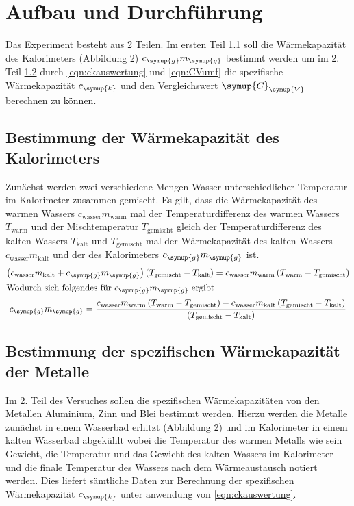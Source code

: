 \section{Aufbau und Durchführung}
\label{sec:Durchführung}
Das Experiment besteht aus 2 Teilen. Im ersten Teil \ref{sec:D1} soll die Wärmekapazität
des Kalorimeters (Abbildung 2) $c_\symup{g}m_\symup{g}$ bestimmt werden um im 2.
Teil \ref{sec:D2} durch \eqref{eqn:ckauswertung} und \eqref{eqn:CVumf} die
spezifische Wärmekapazität $c_\symup{k}$ und den Vergleichswert $\symup{C}_\symup{V}$
berechnen zu können.
\subsection{Bestimmung der Wärmekapazität des Kalorimeters}
\label{sec:D1}
Zunächst werden zwei verschiedene Mengen Wasser unterschiedlicher Temperatur
im Kalorimeter zusammen gemischt.
Es gilt, dass die Wärmekapazität des warmen Wassers
$c_\text{wasser}m_\text{warm}$ mal der Temperaturdifferenz des warmen Wassers
$T_\text{warm}$ und der Mischtemperatur $T_\text{gemischt}$ gleich der
Temperaturdifferenz des kalten Wassers $T_\text{kalt}$ und $T_\text{gemischt}$
mal der Wärmekapazität des kalten Wassers $c_\text{wasser}m_\text{kalt}$
und der des Kalorimeters $c_\symup{g}m_\symup{g}$ ist.
\begin{gather}
  \left(c_\text{wasser}m_\text{kalt}+c_\symup{g}m_\symup{g}\right)
  \left(T_\text{gemischt}-T_\text{kalt}\right)
  = c_\text{wasser}m_\text{warm}\left(T_\text{warm}-T_\text{gemischt}\right)
  \label{eqn:cgmg}\\
  \intertext{Wodurch sich folgendes für $c_\symup{g}m_\symup{g}$ ergibt}
  c_\symup{g}m_\symup{g} = \frac
  {c_\text{wasser}m_\text{warm}\left(T_\text{warm}-T_\text{gemischt}\right)
  -c_\text{wasser}m_\text{kalt}\left(T_\text{gemischt}-T_\text{kalt}\right)}
  {\left(T_\text{gemischt}-T_\text{kalt}\right)}
  \label{eqn:cgmgumf}
\end{gather}
\subsection{Bestimmung der spezifischen Wärmekapazität der Metalle}
\label{sec:D2}
Im 2. Teil des Versuches sollen die spezifischen Wärmekapazitäten von
den Metallen Aluminium, Zinn und Blei bestimmt werden. Hierzu werden die Metalle
zunächst in einem Wasserbad erhitzt (Abbildung 2) und im Kalorimeter in einem
kalten Wasserbad abgekühlt wobei die Temperatur des warmen Metalls wie sein Gewicht,
die Temperatur und das Gewicht des kalten Wassers im Kalorimeter
und die finale Temperatur des Wassers nach dem Wärmeaustausch notiert werden.
Dies liefert sämtliche Daten zur Berechnung der spezifischen Wärmekapazität
$c_\symup{k}$ unter anwendung von \eqref{eqn:ckauswertung}.

